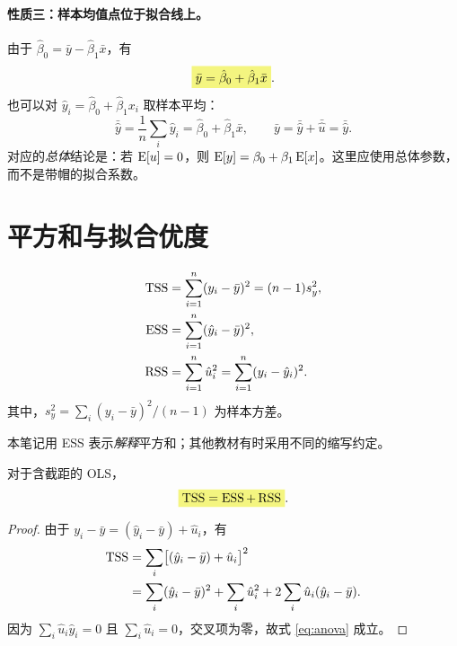 \paragraph{性质三：样本均值点位于拟合线上。}
由于 $\hat\beta_0=\bar y-\hat\beta_1\bar x$，有
\[\hm{\bar y=\hat\beta_0+\hat\beta_1\bar x}.\]
也可以对 $\hat y_i=\hat\beta_0+\hat\beta_1x_i$ 取样本平均：
\[\bar{\hat y}=\frac1n\sum_i\hat y_i=\hat\beta_0+\hat\beta_1\bar x,
\qquad\bar y=\bar{\hat y}+\bar{\hat u}=\bar{\hat y}.\]
对应的\emph{总体}结论是：若 $\operatorname{E}[u]=0$，则 $\operatorname{E}[y]=\beta_0+\beta_1\operatorname{E}[x]$。这里应使用总体参数，而不是带帽的拟合系数。

\section{平方和与拟合优度}
\label{sec:ss-decomposition}
\begin{definition}
\begin{align}
\operatorname{TSS}&=\sum_{i=1}^n(y_i-\bar y)^2=(n-1)s_y^2,\label{eq:tss}\\
\operatorname{ESS}&=\sum_{i=1}^n(\hat y_i-\bar y)^2,\label{eq:ess}\\
\operatorname{RSS}&=\sum_{i=1}^n\hat u_i^2=\sum_{i=1}^n(y_i-\hat y_i)^2.\label{eq:rss}
\end{align}
其中，$s_y^2=\sum_i(y_i-\bar y)^2/(n-1)$ 为样本方差。
\end{definition}
本笔记用 ESS 表示\emph{解释}平方和；其他教材有时采用不同的缩写约定。

\begin{theorem}[平方和分解]
对于含截距的 OLS，
\begin{equation}\label{eq:anova}
\hm{\TSS=\ESS+\RSS}.
\end{equation}
\end{theorem}
\begin{proof}
由于 $y_i-\bar y=(\hat y_i-\bar y)+\hat u_i$，有
\begin{align*}
\operatorname{TSS}
&=\sum_i\bigl[(\hat y_i-\bar y)+\hat u_i\bigr]^2\\
&=\sum_i(\hat y_i-\bar y)^2+\sum_i\hat u_i^2
  +2\sum_i\hat u_i(\hat y_i-\bar y).
\end{align*}
因为 $\sum_i\hat u_i\hat y_i=0$ 且 $\sum_i\hat u_i=0$，交叉项为零，故式 \eqref{eq:anova} 成立。
\end{proof}

